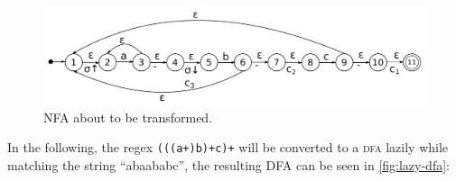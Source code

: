 \documentclass[english]{sigplanconf}
\begin{document}
\begin{figure}
\begin{centering}
\includegraphics[width=\linewidth]{graphs/abc}
\par\end{centering}

\caption{NFA about to be transformed.}
\end{figure}
In the following, the regex \texttt{(((a+)b)+c)+} will be converted
to a \textsc{dfa} lazily while matching the string ``abaababc'',
the resulting DFA can be seen in \ref{fig:lazy-dfa}: 
\end{document}
